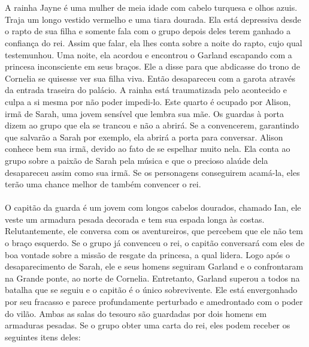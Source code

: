 %
\vfill
%
\\\\
%
 A rainha Jayne é uma mulher de meia idade com cabelo turquesa e olhos azuis. Traja um longo vestido vermelho e uma tiara dourada. 
Ela está depressiva desde o rapto de sua filha e somente fala com o grupo depois deles terem ganhado a confiança do rei.
Assim que falar, ela lhes conta sobre a noite do rapto, cujo qual testemunhou.
Uma noite, ela acordou e encontrou o Garland escapando com a princesa inconsciente em seus braços.
Ele a disse para que abdicasse do trono de Cornelia se quisesse ver sua filha viva. Então desapareceu com a garota através da entrada traseira do palácio.
A rainha está traumatizada pelo acontecido e culpa a si mesma por não poder impedi-lo.
%
\vfill
%
 Este quarto é ocupado por Alison, irmã de Sarah, uma jovem sensível que lembra sua mãe. 
Os guardas à porta dizem ao grupo que ela se trancou e não a abrirá.
Se a convencerem, garantindo que salvarão a Sarah por exemplo, ela abrirá a porta para conversar.
Alison conhece bem sua irmã, devido ao fato de se espelhar muito nela.
Ela conta ao grupo sobre a paixão de Sarah pela música e que o precioso alaúde dela desapareceu assim como sua irmã.
Se os personagens conseguirem acamá-la, eles terão uma chance melhor de também convencer o rei.
%
\clearpage
%
\\\\
%
 O capitão da guarda é um jovem com longos cabelos dourados, chamado Ian, ele veste um armadura pesada decorada e tem sua espada longa às costas.
Relutantemente, ele conversa com os aventureiros, que percebem que ele não tem o braço esquerdo.
Se o grupo já convenceu o rei, o capitão conversará com eles de boa vontade sobre a missão de resgate da princesa, a qual lidera.
Logo após o desaparecimento de Sarah, ele e seus homens seguiram Garland e o confrontaram na Grande ponte, ao norte de Cornelia.
Entretanto, Garland superou a todos na batalha que se seguiu e o capitão é o único sobrevivente.
Ele está envergonhado por seu fracasso e parece profundamente perturbado e amedrontado com o poder do vilão.
%
\ofpar
%
Ambas as salas do tesouro são guardadas por dois homens em armaduras pesadas. Se o grupo obter uma carta do rei, eles podem receber os seguintes itens deles:

